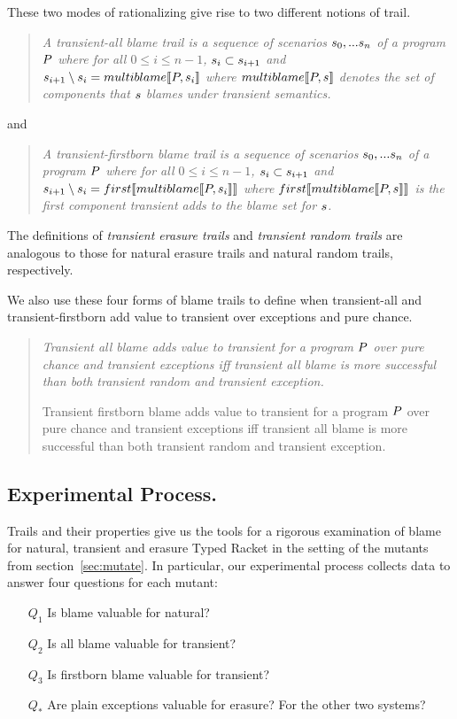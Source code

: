 These two modes of rationalizing give rise to two different notions of trail.
\begin{quote}
\it A \emph{ transient-all blame trail} is a sequence of scenarios
$s_0,...s_n$ of a program $P$ where for all $0 \leq i \leq n - 1$,
$s_i \subset s_{i+1}$ and ~$s_{i+1} \setminus s_i = multiblame\llbracket P,
s_i\rrbracket$ where $multiblame\llbracket P, s\rrbracket$ denotes the set of components that $s$
blames under transient semantics.
\end{quote}
\noindent
and
\begin{quote}
\it A \emph{transient-firstborn blame trail} is a sequence of scenarios
$s_0,...s_n$ of a program $P$ where for all $0 \leq i \leq n - 1$,
$s_i \subset s_{i+1}$ and $s_{i+1} \setminus s_i =
first\llbracket multiblame\llbracket P, s_i\rrbracket\rrbracket$ where $first\llbracket multiblame\llbracket P, s\rrbracket\rrbracket$ is the
first component transient adds to the blame set for $s$.
\end{quote}
The definitions of \emph{transient erasure trails} and \emph{transient random
trails} are analogous to those for natural erasure trails and natural random trails,
respectively. 

We also use these four forms of blame trails to define when transient-all and
transient-firstborn add value to transient over exceptions and pure chance.
\begin{quote}
\it 
Transient all blame adds value to transient for a program $P$ over
  pure chance and transient exceptions iff transient all blame 
  is more successful than both transient random and transient exception.

Transient firstborn blame adds value to transient for a program $P$ over
  pure chance and transient exceptions iff transient all blame 
  is more successful than both transient random and transient exception.

\end{quote}

\subsection{Experimental Process.}

Trails and their properties give us the tools for a rigorous examination
of blame for natural, transient and erasure Typed Racket in the setting of the 
mutants from section~\ref{sec:mutate}. In particular, our experimental
process collects data to answer four questions for each mutant:
\begin{itemize}
\item[$Q_1$] Is blame valuable for natural?

\item[$Q_2$] Is all blame valuable for transient?

\item[$Q_3$] Is firstborn blame valuable for transient?

\item[$Q_*$] Are plain exceptions valuable for
  erasure? For the other two systems? 
\end{itemize}

